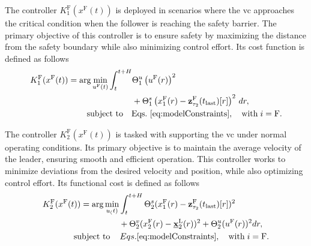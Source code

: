 \documentclass[letterpaper, 10 pt, conference]{ieeeconf}
\theoremstyle{definition}
\theoremstyle{nopoint}
\begin{document}
\begin{comment}
	\mathbf{z}_{\bar{\tau}}^\mathrm{F}(t_{\mathrm{last}})[t]
\end{comment}


The controller $K^{\mathrm{F}}_1(x^{\mathrm{F}}(t))$  is deployed in scenarios where the \gls{vc} approaches the critical condition when the follower is reaching the safety barrier. The primary objective of this controller is to ensure safety by maximizing the distance from the safety boundary while also minimizing control effort.  Its cost function is defined as follows
%
%
\begin{equation}
	\label{eq:K_1_controller}
	\begin{aligned}
		K^{\mathrm{F}}_1(x^\mathrm{F}(t)) = \arg \min_{u^\mathrm{F}(t)} \int_{t}^{t+H} &  \Theta^u_1\left(u^\mathrm{F}(r)\right)^2  \\  
		& + \Theta^s_1\left(x_1^{\mathrm{F}}(r) - \mathbf{z}_{\tau_2}^\mathrm{F}(t_{\mathrm{last}})[r]\right)^2 \, dr, \\
		&\hspace{-1.9cm} \text{subject to} \quad \text{Eqs.}~\eqref{eq:modelConstraints}, \quad \mathrm{with} \; i = \mathrm{F}.
	\end{aligned}
\end{equation}
%

The controller $K^{\mathrm{F}}_2(x^{\mathrm{F}}(t))$ is tasked with supporting the \gls{vc} under normal operating conditions. Its primary objective is to maintain the average velocity of the leader, ensuring smooth and efficient operation. This controller works to minimize deviations from the desired velocity and position, while also optimizing control effort. Its functional cost is defined as follows
%
%
\begin{equation}
	\label{eq:K_2_controller}
	\begin{aligned}
		K^{\mathrm{F}}_2(x^\mathrm{F}(t)) = \arg  \min_{u_(t)} &\int_{t}^{t+H} \Theta^s_2(x_1^{\mathrm{F}}(r)-\mathbf{z}_{\tau_2}^\mathrm{F}(t_{\mathrm{last}})[r])^2 \\ &+\Theta^v_2(x_2^{\mathrm{F}}(r)-\underline{\mathbf{x}}_2^\mathrm{L}(r))^2  +  \Theta^u_2(u^{\mathrm{F}}(r))^2 dr, \\
		&	\hspace{-1.9cm} \text{subject to} \qquad \hspace{-1cm}  \qquad Eqs.\eqref{eq:modelConstraints}, \quad \mathrm{with} \; i = \mathrm{F}.
		\end{aligned}
\end{equation}
\end{document}
